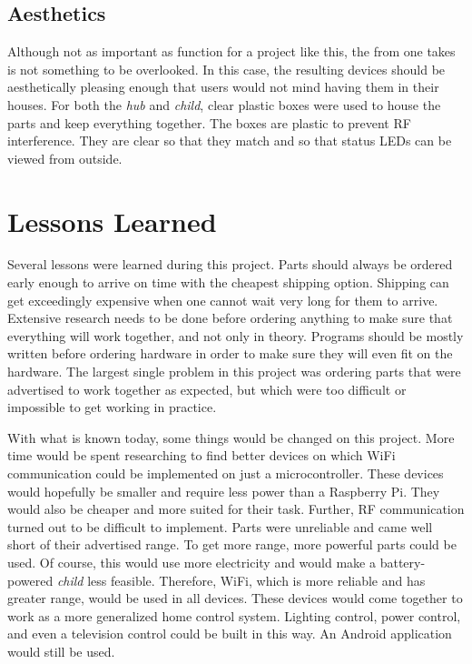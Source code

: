 \documentclass[12pt]{article}
\begin{document}
\subsection*{Aesthetics}
Although not as important as function for a project like this, the from one takes is not something to be overlooked. In this case, the resulting devices should be aesthetically pleasing enough that users would not mind having them in their houses. For both the \emph{hub} and \emph{child}, clear plastic boxes were used to house the parts and keep everything together. The boxes are plastic to prevent RF interference. They are clear so that they match and so that status LEDs can be viewed from outside. 

\section*{Lessons Learned}
 Several lessons were learned during this project. Parts should always be ordered early enough to arrive on time with the cheapest shipping option. Shipping can get exceedingly expensive when one cannot wait very long for them to arrive. Extensive research needs to be done before ordering anything to make sure that everything will work together, and not only in theory. Programs should be mostly written before ordering hardware in order to make sure they will even fit on the hardware. The largest single problem in this project was ordering parts that were advertised to work together as expected, but which were too difficult or impossible to get working in practice. 
 
 With what is known today, some things would be changed on this project. More time would be spent researching to find better devices on which WiFi communication could be implemented on just a microcontroller. These devices would hopefully be smaller and require less power than a Raspberry Pi. They would also be cheaper and more suited for their task. Further, RF communication turned out to be difficult to implement. Parts were unreliable and came well short of their advertised range. To get more range, more powerful parts could be used. Of course, this would use more electricity and would make a battery-powered \emph{child} less feasible. Therefore, WiFi, which is more reliable and has greater range, would be used in all devices. These devices would come together to work as a more generalized home control system. Lighting control, power control, and even a television control could be built in this way. An Android application would still be used. 
\end{document}
